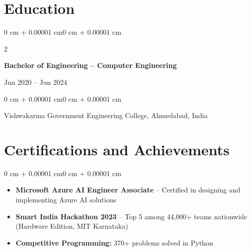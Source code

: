 \documentclass[10pt, letterpaper]{article}
\newenvironment{highlightsforbulletentries}{
    \begin{itemize}[
        topsep=0.10 cm,
        parsep=0.10 cm,
        partopsep=0pt,
        itemsep=0pt,
        leftmargin=10pt
    ]
}{
    \end{itemize}
}
\newenvironment{onecolentry}{
    \begin{adjustwidth}{0 cm + 0.00001 cm}{0 cm + 0.00001 cm}
}{
    \end{adjustwidth}
}
\newenvironment{twocolentry}[2][]{
    \onecolentry
    \def\secondColumn{#2}
    \setcolumnwidth{\fill, 5.5 cm}
    \begin{paracol}{2}
}{
    \switchcolumn \raggedleft \secondColumn
    \end{paracol}
    \endonecolentry
}
\begin{document}
    \section{Education}

        \begin{twocolentry}{
            Jun 2020 -- Jun 2024
        }
            \textbf{Bachelor of Engineering -- Computer Engineering}
        \end{twocolentry}

        \vspace{0.10 cm}
        \begin{onecolentry}
            Vishwakarma Government Engineering College, Ahmedabad, India
        \end{onecolentry}

    \section{Certifications and Achievements}

    \begin{onecolentry}
        \begin{highlightsforbulletentries}
            \item \textbf{Microsoft Azure AI Engineer Associate} -- Certified in designing and implementing Azure AI solutions
            \item \textbf{Smart India Hackathon 2023} -- Top 5 among 44,000+ teams nationwide (Hardware Edition, MIT Karnataka)
            \item \textbf{Competitive Programming:} 370+ problems solved in Python
        \end{highlightsforbulletentries}
    \end{onecolentry}
\end{document}
